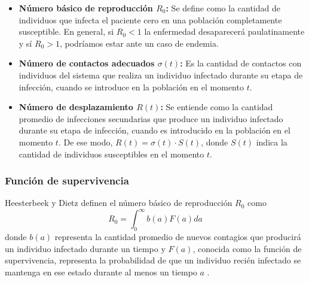 \begin{itemize}
    \item \textbf{Número básico de reproducción $R_0$:} Se define como la cantidad de individuos que infecta el paciente cero en una población completamente susceptible. En general, si $R_0<1$ la enfermedad desaparecerá paulatinamente y sí $R_0>1$, podríamos estar ante un caso de endemia.
    \item \textbf{Número de contactos adecuados $\sigma(t)$:} Es la cantidad de contactos con individuos del sistema que realiza un individuo infectado durante su etapa de infección, cuando se introduce en la población en el momento $t$.
    \item \textbf{Número de desplazamiento $R(t)$:} Se entiende como la cantidad promedio de infecciones secundarias que produce un individuo infectado durante su etapa de infección, cuando es introducido en la población en el momento $t$. De ese modo, $R(t) = \sigma(t)\cdot S(t)$, donde $S(t)$ indica la cantidad de individuos susceptibles en el momento $t$.
\end{itemize}

\subsubsection{Función de supervivencia}
Heesterbeek y Dietz definen el número básico de reproducción $R_0$ como
\begin{equation}
    R_0 = \int_0^\infty b(a)F(a) da
\end{equation}
donde $b(a)$ representa la cantidad promedio de nuevos contagios que producirá un individuo infectado durante un tiempo y $F(a)$, conocida como la función de supervivencia, representa la probabilidad de que un individuo recién infectado se mantenga en ese estado durante al menos un tiempo $a$ \cite{conceptOfR0, perspectivesOnR0}.